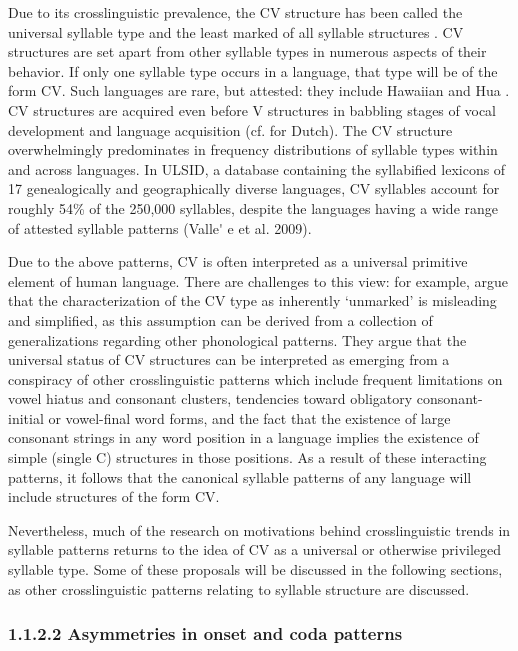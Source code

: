   Due to its crosslinguistic prevalence, the CV structure has been called the universal syllable type and the least marked of all syllable structures \citep{Zec2007}. CV structures are set apart from other syllable types in numerous aspects of their behavior. If only one syllable type occurs in a language, that type will be of the form CV. Such languages are rare, but attested: they include Hawaiian \citep{Maddieson2011} and Hua \citep{Blevins1995}. CV structures are acquired even before V structures in babbling stages of vocal development and language acquisition (cf. \citealt{LeveltEtAl2000} for Dutch). The CV structure overwhelmingly predominates in frequency distributions of syllable types within and across languages. In ULSID, a database containing the syllabified lexicons of 17 genealogically and geographically diverse languages, CV syllables account for roughly 54\% of the 250,000 syllables, despite the languages having a wide range of attested syllable patterns (Valle\'{} e et al. 2009).



  Due to the above patterns, CV is often interpreted as a universal primitive element of human language. There are challenges to this view: for example, \citet{BellHooper1978} argue that the characterization of the CV type as inherently ‘unmarked’ is misleading and simplified, as this assumption can be derived from a collection of generalizations regarding other phonological patterns. They argue that the universal status of CV structures can be interpreted as emerging from a conspiracy of other crosslinguistic patterns which include frequent limitations on vowel hiatus and consonant clusters, tendencies toward obligatory consonant-initial or vowel-final word forms, and the fact that the existence of large consonant strings in any word position in a language implies the existence of simple (single C) structures in those positions. As a result of these interacting patterns, it follows that the canonical syllable patterns of any language will include structures of the form CV.



  Nevertheless, much of the research on motivations behind crosslinguistic trends in syllable patterns returns to the idea of CV as a universal or otherwise privileged syllable type. Some of these proposals will be discussed in the following sections, as other crosslinguistic patterns relating to syllable structure are discussed.


\subsubsection{\textbf{1.1.2.2} \textbf{Asymmetries} \textbf{in} \textbf{onset} \textbf{and} \textbf{coda} \textbf{patterns}}


